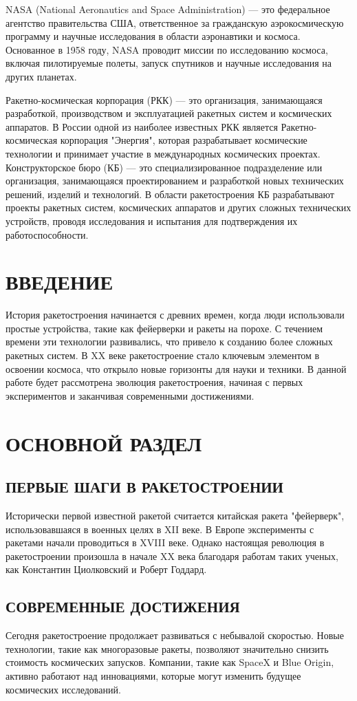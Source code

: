 \documentclass[14pt]{extarticle} %
\newcommand{\newsection}[1]{
    \clearpage
    \section{#1}
}
\newcommand{\newsectionstar}[1]{%
    \clearpage
    \section*{#1} %
    \addcontentsline{toc}{section}{#1} %
}
\begin{document}
NASA (National Aeronautics and Space Administration) — это федеральное агентство правительства США, ответственное за гражданскую аэрокосмическую программу и научные исследования в области аэронавтики и космоса. Основанное в 1958 году, NASA проводит миссии по исследованию космоса, включая пилотируемые полеты, запуск спутников и научные исследования на других планетах.

Ракетно-космическая корпорация (РКК) — это организация, занимающаяся разработкой, производством и эксплуатацией ракетных систем и космических аппаратов. В России одной из наиболее известных РКК является Ракетно-космическая корпорация "Энергия", которая разрабатывает космические технологии и принимает участие в международных космических проектах.\\

Конструкторское бюро (КБ) — это специализированное подразделение или организация, занимающаяся проектированием и разработкой новых технических решений, изделий и технологий. В области ракетостроения КБ разрабатывают проекты ракетных систем, космических аппаратов и других сложных технических устройств, проводя исследования и испытания для подтверждения их работоспособности.

\newsectionstar{ВВЕДЕНИЕ}
История ракетостроения начинается с древних времен, когда люди использовали простые устройства, такие как фейерверки и ракеты на порохе. С течением времени эти технологии развивались, что привело к созданию более сложных ракетных систем. В XX веке ракетостроение стало ключевым элементом в освоении космоса, что открыло новые горизонты для науки и техники. В данной работе будет рассмотрена эволюция ракетостроения, начиная с первых экспериментов и заканчивая современными достижениями.\\


\newsection{ОСНОВНОЙ РАЗДЕЛ}

\subsection{ПЕРВЫЕ ШАГИ В РАКЕТОСТРОЕНИИ}
Исторически первой известной ракетой считается китайская ракета "фейерверк", использовавшаяся в военных целях в XII веке. В Европе эксперименты с ракетами начали проводиться в XVIII веке. Однако настоящая революция в ракетостроении произошла в начале XX века благодаря работам таких ученых, как Константин Циолковский и Роберт Годдард.

\subsection{СОВРЕМЕННЫЕ ДОСТИЖЕНИЯ}
Сегодня ракетостроение продолжает развиваться с небывалой скоростью. Новые технологии, такие как многоразовые ракеты, позволяют значительно снизить стоимость космических запусков. Компании, такие как SpaceX и Blue Origin, активно работают над инновациями, которые могут изменить будущее космических исследований.
\end{document}
